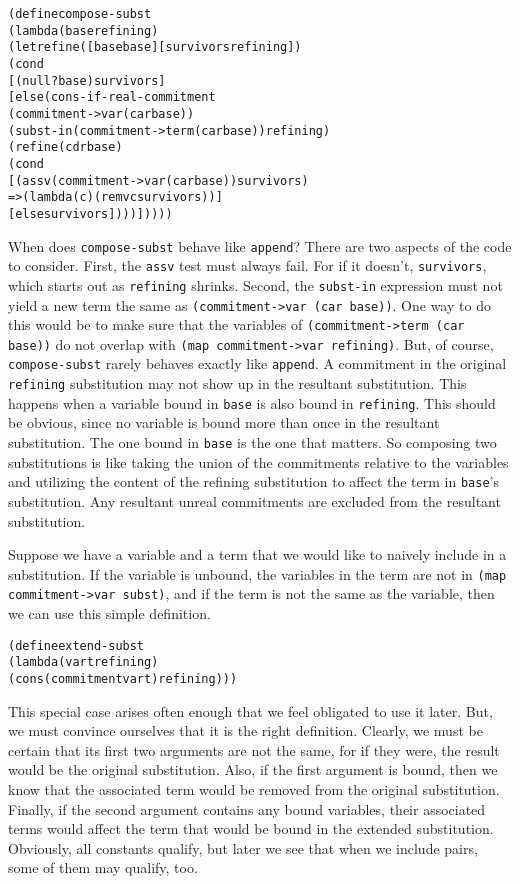 \begin{alltt}
(define compose-subst
  (lambda (base refining)
    (let refine ([base base] [survivors refining])
      (cond
        [(null? base) survivors]
        [else (cons-if-real-commitment
                (commitment->var (car base))
                (subst-in (commitment->term (car base)) refining)
                (refine (cdr base)
                  (cond
                    [(assv (commitment->var (car base)) survivors)
                     => (lambda (c) (remv c survivors))]
                    [else survivors])))]))))
\end{alltt}
When does \texttt{compose-subst} behave like \texttt{append}?  There
are two aspects of the code to consider.  First, the \texttt{assv}
test must always fail.  For if it doesn't, \texttt{survivors}, which
starts out as \texttt{refining} shrinks. Second, the \texttt{subst-in}
expression must not yield a new term the same as
\texttt{(commitment->var (car base))}.  One way to do this would be to
make sure that the variables of \texttt{(commitment->term (car base))}
do not overlap with \texttt{(map commitment->var refining)}.
\newpage
But, of course, \texttt{compose-subst} rarely behaves exactly like
\texttt{append}.  A commitment in the original \texttt{refining}
substitution may not show up in the resultant substitution.  This
happens when a variable bound in \texttt{base} is also bound in
\texttt{refining}.  This should be obvious, since no variable is bound
more than once in the resultant substitution.  The one bound in
\texttt{base} is the one that matters.  So composing two substitutions
is like taking the union of the commitments relative to the
variables and utilizing the content of the refining substitution to
affect the term in \texttt{base}'s substitution.  Any resultant
unreal commitments are excluded from the resultant substitution.

Suppose we have a variable and a term that we would like to naively
include in a substitution.  If the variable is unbound, the
variables in the term are not in \texttt{(map commitment->var subst)},
and if the term is not the same as the variable, then we can use this
simple definition.

\begin{alltt}
(define extend-subst
  (lambda (var t refining)
    (cons (commitment var t) refining)))
\end{alltt}

This special case arises often enough that we feel obligated to use it
later.  But, we must convince ourselves that it is the right
definition.  Clearly, we must be certain that its first two arguments
are not the same, for if they were, the result would be the original
substitution.  Also, if the first argument is bound, then we know that
the associated term would be removed from the original substitution.
Finally, if the second argument contains any bound variables, their
associated terms would affect the term that would be bound in the
extended substitution.  Obviously, all constants qualify, but later we
see that when we include pairs, some of them may qualify, too.

